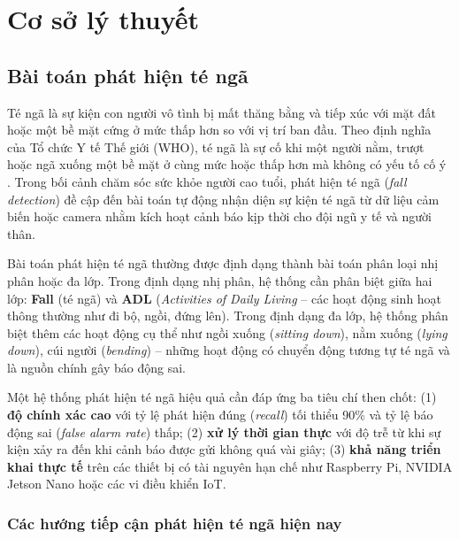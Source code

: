 \chapter{Cơ sở lý thuyết}
\label{chap:theoretical_background}

\section{Bài toán phát hiện té ngã}
\label{sec:fall_detection_problem}

Té ngã là sự kiện con người vô tình bị mất thăng bằng và tiếp xúc với mặt đất hoặc một bề mặt cứng ở mức thấp hơn so với vị trí ban đầu. Theo định nghĩa của Tổ chức Y tế Thế giới (WHO), té ngã là sự cố khi một người nằm, trượt hoặc ngã xuống một bề mặt ở cùng mức hoặc thấp hơn mà không có yếu tố cố ý \cite{who2021falls}. Trong bối cảnh chăm sóc sức khỏe người cao tuổi, phát hiện té ngã (\textit{fall detection}) đề cập đến bài toán tự động nhận diện sự kiện té ngã từ dữ liệu cảm biến hoặc camera nhằm kích hoạt cảnh báo kịp thời cho đội ngũ y tế và người thân.

Bài toán phát hiện té ngã thường được định dạng thành bài toán phân loại nhị phân hoặc đa lớp. Trong định dạng nhị phân, hệ thống cần phân biệt giữa hai lớp: \textbf{Fall} (té ngã) và \textbf{ADL} (\textit{Activities of Daily Living} -- các hoạt động sinh hoạt thông thường như đi bộ, ngồi, đứng lên). Trong định dạng đa lớp, hệ thống phân biệt thêm các hoạt động cụ thể như ngồi xuống (\textit{sitting down}), nằm xuống (\textit{lying down}), cúi người (\textit{bending}) -- những hoạt động có chuyển động tương tự té ngã và là nguồn chính gây báo động sai.

Một hệ thống phát hiện té ngã hiệu quả cần đáp ứng ba tiêu chí then chốt: (1) \textbf{độ chính xác cao} với tỷ lệ phát hiện đúng (\textit{recall}) tối thiểu 90\% và tỷ lệ báo động sai (\textit{false alarm rate}) thấp; (2) \textbf{xử lý thời gian thực} với độ trễ từ khi sự kiện xảy ra đến khi cảnh báo được gửi không quá vài giây; (3) \textbf{khả năng triển khai thực tế} trên các thiết bị có tài nguyên hạn chế như Raspberry Pi, NVIDIA Jetson Nano hoặc các vi điều khiển IoT.

\subsection{Các hướng tiếp cận phát hiện té ngã hiện nay}
\label{sec:fall_detection_methods}

